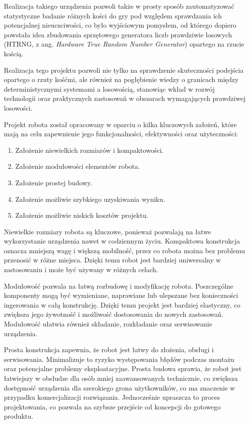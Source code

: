 Realizacja takiego urządzenia pozwoli także w prosty sposób zautomatyzować statystyczne badanie różnych
kości do gry pod względem sprawdzania ich potencjalnej nieuczciwości,
co było wyjściowym pomysłem, od którego dopiero powstała idea zbudowania sprzętowego generatora liczb prawdziwie losowych
(HTRNG, z ang. \textit{Hardware True Random Number Generator}) opartego na rzucie kością.

Realizacja tego projektu pozwoli nie tylko na sprawdzenie skuteczności podejścia opartego o rzuty kośćmi,
ale również na pogłębienie wiedzy o granicach między deterministycznymi systemami a losowością,
stanowiąc wkład w rozwój technologii oraz praktycznych zastosowań w obszarach wymagających prawdziwej losowości.

Projekt robota został opracowany w oparciu o kilka kluczowych założeń, które mają na celu zapewnienie jego funkcjonalności, efektywności oraz użyteczności:
\begin{enumerate}
    \item Założenie niewielkich rozmiarów i kompaktowości.
    \item Założenie modułowości elementów robota.
    \item Założenie prostej budowy.
    \item Założenie możliwie szybkiego uzyskiwania wyniku.
    \item Założenie możliwie niskich kosztów projektu.
\end{enumerate}

Niewielkie rozmiary robota są kluczowe, ponieważ pozwalają na łatwe wykorzystanie urządzenia nawet w codziennym życiu.
Kompaktowa konstrukcja oznacza mniejszą wagę i większą mobilność, przez co robota można bez problemu przenosić w różne miejsca.
Dzięki temu robot jest bardziej uniwersalny w zastosowaniu i może być używany w różnych celach.

Modułowość pozwala na łatwą rozbudowę i modyfikację robota.
Poszczególne komponenty mogą być wymieniane, naprawiane lub ulepszane bez konieczności ingerowania w całą konstrukcję.
Dzięki temu projekt jest bardziej elastyczny, co zwiększa jego żywotność i możliwość dostosowania do nowych zastosowań.
Modułowość ułatwia również składanie, rozkładanie oraz serwisowanie urządzenia.

Prosta konstrukcja zapewnia, że robot jest łatwy do złożenia, obsługi i serwisowania.
Minimalizuje to ryzyko występowania błędów podczas montażu oraz potencjalne problemy eksploatacyjne.
Prosta budowa sprawia, że robot jest łatwiejszy w obsłudze dla osób mniej zaawansowanych technicznie, co zwiększa dostępność
urządzenia dla szerokiego grona użytkowników, co ma znaczenie w przypadku komercjalizacji rozwiązania.
Jednocześnie upraszcza to proces projektowania, co pozwala na szybsze przejście od koncepcji do gotowego produktu.

